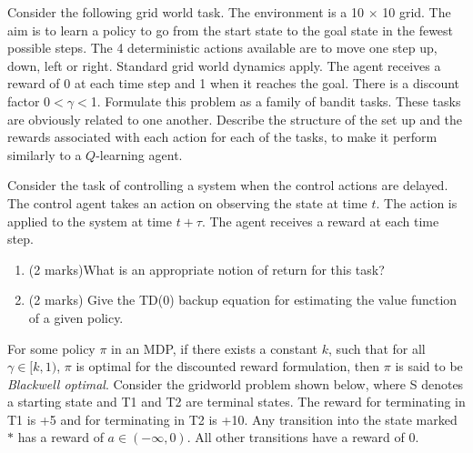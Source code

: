 \documentclass[addpoints,12pt,solution]{exam}
\begin{document}
\begin{questions}

 Consider the following grid world task. The environment
is a 10 $\times$ 10 grid. The aim is to learn a policy to go from the start
state to the goal state in the fewest possible steps. The 4 deterministic
actions available are to move one step up, down, left or right. Standard
grid world dynamics apply. The agent receives a reward of 0 at each
time step and 1 when it reaches the goal. There is a discount factor
0$< \gamma <$1. Formulate this problem as a family of bandit tasks. These
tasks are obviously related to one another. Describe the structure of
the set up and the rewards associated with each action for each of the
tasks, to make it perform similarly to a $Q$-learning agent.

\begin{solution}

\end{solution}


 Consider the task of controlling a system when the control actions are delayed. The control agent takes an action on observing the state at time $t$. The action is applied to the system at time $t + \tau$. The agent
receives a reward at each time step.
\begin{enumerate}[label=(\alph*)]

\item (2 marks)What is an appropriate notion of return for this task?

\begin{solution}

\end{solution}

\item (2 marks) Give the TD(0) backup equation for estimating the value function of a given policy.

\begin{solution}

\end{solution}
\end{enumerate}
        
 For some policy $\pi$ in an MDP, if there exists a constant
$k$, such that for all $\gamma \in [k,1)$, $\pi$ is optimal for the discounted
reward formulation, then $\pi$ is said to be {\it Blackwell optimal}. Consider
the gridworld problem shown below, where S denotes a starting state and 
T1 and T2 are terminal states. The reward for terminating in T1 is +5 and 
for terminating in T2 is +10. Any transition into the state marked $*$ has a
reward of $a \in (-\infty,0)$. All other transitions have a reward of $0$. 


\end{questions}
\end{document}
